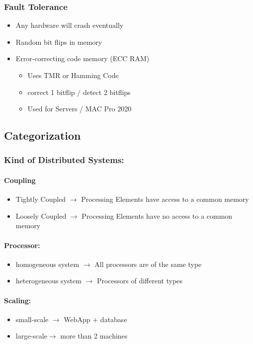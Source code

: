 \subsubsection{Fault Tolerance}
\begin{itemize}
    \item Any hardware will crash eventually
    \item Random bit flips in memory
    \item Error-correcting code memory (ECC RAM)
    \begin{itemize}
        \item Uses TMR or Hamming Code
        \item correct 1 bitflip / detect 2 bitflips 
        \item Used for Servers / MAC Pro 2020
    \end{itemize}
\end{itemize}


\subsection{Categorization}
\subsubsection{Kind of Distributed Systems:}
\paragraph{Coupling}
\begin{itemize}
    \item Tightly Coupled $\rightarrow$ Processing Elements have access to a common memory
    \item Loosely Coupled $\rightarrow$ Processing Elements have  no access to a common memory
\end{itemize}
\paragraph{Processor:}
\begin{itemize}    
    \item homogeneous system $\rightarrow$ All processors are of the same type
    \item heterogeneous system $\rightarrow$ Processors of different types
\end{itemize}
\paragraph{Scaling:}
\begin{itemize}
    \item small-scale $\rightarrow$ WebApp + database
    \item large-scale$\rightarrow$ more than 2 machines
\end{itemize}


